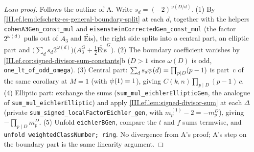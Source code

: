 \begin{proof}[Lean proof]
Follows the outline of A. Write $s_d=(-2)^{\omega(D/d)}$. (1) By \cref{III.ef.lem:lefschetz-es-general-boundary-split} at each $d$, together with the helpers \texttt{cohenA3Gen\_const\_mul} and \texttt{eisensteinCorrectedGen\_const\_mul} (the factor $2^{\omega(d)}$ pulls out of $A_3$ and $\tilde{\mathrm{Eis}}$), the right side splits into a central part, an elliptic part and $\bigl(\sum_d s_d2^{\omega(d)}\bigr)\bigl(A_3^G+\tfrac12\tilde{\mathrm{Eis}}^G\bigr)$. (2) The boundary coefficient vanishes by \cref{III.ef.cor:signed-divisor-sum-constants}b ($D>1$ since $\omega(D)$ is odd, \texttt{one\_lt\_of\_odd\_omega}). (3) Central part: $\sum_ds_d\psi(d)=\prod_{p\mid D}(p-1)$ is part~c of the same corollary at $M=1$ (with $\psi(1)=1$), giving $C(k,n)\prod_{p\mid D}(p-1)\,c$. (4) Elliptic part: exchange the sums (\texttt{sum\_mul\_eichlerEllipticGen}, the analogue of \texttt{sum\_mul\_eichlerElliptic}) and apply \cref{III.ef.lem:signed-divisor-sum} at each $\Delta$ (private \texttt{sum\_signed\_localFactorEichler\_gen}, with $m^{(1)}_p-2=-m^D_p$), giving $-\prod_{p\mid D}m^D_p$. (5) Unfold \texttt{eichlerBGen}, compare the $t$ and $f$ sums termwise, and \texttt{unfold weightedClassNumber; ring}. No divergence from A's proof; A's step on the boundary part is the same linearity argument.
\end{proof}

